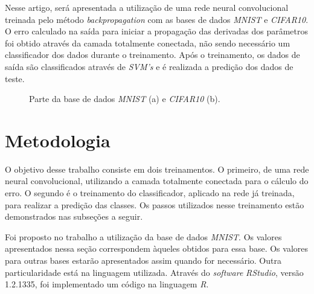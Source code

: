 \documentclass[conference]{IEEEtran}
\begin{document}
Nesse artigo, será apresentada a utilização de uma rede neural convolucional treinada pelo método \textit{backpropagation} com as bases de dados \textit{MNIST} e \textit{CIFAR10}. O erro calculado na saída para iniciar a propagação das derivadas dos parâmetros foi obtido através da camada totalmente conectada, não sendo necessário um classificador dos dados durante o treinamento. Após o treinamento, os dados de saída são classificados através de \textit{SVM's} e é realizada a predição dos dados de teste.

\begin{figure}[h]
\centering
{}\quad
{}
\caption{Parte da base de dados \textit{MNIST} (a) e \textit{CIFAR10} (b).}
\label{figbase}
\end{figure}


\section{Metodologia }\label{metod}

O objetivo desse trabalho consiste em dois treinamentos. O primeiro, de uma rede neural convolucional, utilizando a camada totalmente conectada para o cálculo do erro. O segundo é o treinamento do classificador, aplicado na rede já treinada, para realizar a predição das classes. Os passos utilizados nesse treinamento estão demonstrados nas subseções a seguir.

Foi proposto no trabalho a utilização da base de dados \textit{MNIST}. Os valores apresentados nessa seção correspondem àqueles obtidos para essa base. Os valores para outras bases estarão apresentados assim quando for necessário. Outra particularidade está na linguagem utilizada. Através do \textit{software} \textit{RStudio}, versão 1.2.1335, foi implementado um código na linguagem \textit{R}.
\end{document}
